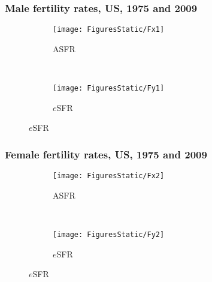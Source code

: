 \documentclass{beamer}
\begin{document}
\begin{frame}
\frametitle{Male fertility rates, US, 1975 and 2009}
\vspace{-5em}
\begin{figure}
        \centering
        \begin{subfigure}[b]{0.5\textwidth}
                \centering
                \caption*{ASFR}
                \texttt{[image: FiguresStatic/Fx1]}
        \end{subfigure}%
        ~ %
        \begin{subfigure}[b]{0.5\textwidth}
                \centering
                \caption*{$e$SFR}
                \texttt{[image: FiguresStatic/Fy1]}
        \end{subfigure}
\end{figure}
\end{frame}
\begin{frame}
\frametitle{Female fertility rates, US, 1975 and 2009}
\vspace{-5em}
\begin{figure}
        \centering
        \begin{subfigure}[b]{0.5\textwidth}
                \centering
                \caption*{ASFR}
                \texttt{[image: FiguresStatic/Fx2]}
        \end{subfigure}%
        ~ %
        \begin{subfigure}[b]{0.5\textwidth}
                \centering
                \caption*{$e$SFR}
                \texttt{[image: FiguresStatic/Fy2]}
        \end{subfigure}
\end{figure}
\end{frame}
\end{document}
